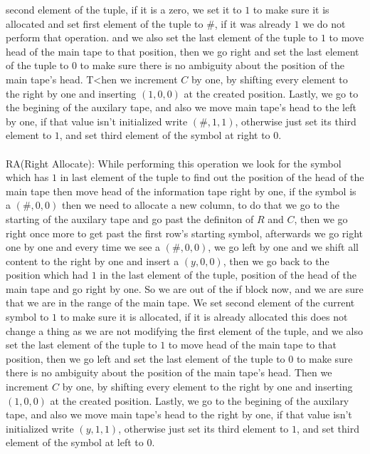\documentclass[12pt]{article}
\begin{document}
second element of the tuple, if it is a zero, we set it to $1$ to make sure it is allocated
and set first element of the tuple to $\#$, if it was already $1$ we do not perform that operation.
and we also set the last element of the tuple to $1$ to move head of the main tape to that position,
then we go right and set the last element of the tuple to $0$ to make sure there is no ambiguity about
the position of the main tape's head. T<hen we increment $C$ by one, by shifting every element to the right
by one and inserting $(1,0,0)$ at the created position. Lastly, we go to the begining of the auxilary tape, and also we move 
main tape's head to the left by one, if that value isn't initialized write $(\#,1,1)$, otherwise
just set its third element to $1$, and set third element of the symbol at right to $0$.\\
\\
RA(Right Allocate): While performing this operation we look for the symbol which has $1$ in
last element of the tuple to find out the position of the head of the main tape then move head 
of the information tape right by one, if the symbol is a $(\#,0,0)$
then we need to allocate a new column, to do that we go to the starting of the auxilary tape
and go past the definiton of $R$ and $C$, then we go right once more to get past the
first row's starting symbol, afterwards we go right one by one and
every time we see a $(\#,0,0)$, we go left by one and we shift all content to the right by one and insert a
$(y,0,0)$, then we go back to the position which had $1$ in the last element of the tuple,
position of the head of the main tape and go right by one. So we are out of the if block now,
and we are sure that we are in the range of the main tape. We set second element of the current
symbol to $1$ to make sure it is allocated, if it is already allocated this does not change a thing
as we are not modifying the first element of the tuple, and we also set the last element of the
tuple to $1$ to move head of the main tape to that position, then we go left and set the
last element of the tuple to $0$ to make sure there is no ambiguity about the position of the
main tape's head. Then we increment $C$ by one, by shifting every element to the right
by one and inserting $(1,0,0)$ at the created position. Lastly, we go to the begining of the auxilary tape, and also we move main tape's
head to the right by one, if that value isn't initialized write $(y,1,1)$, otherwise
just set its third element to $1$, and set third element of the symbol at left to $0$.\\
\end{document}
